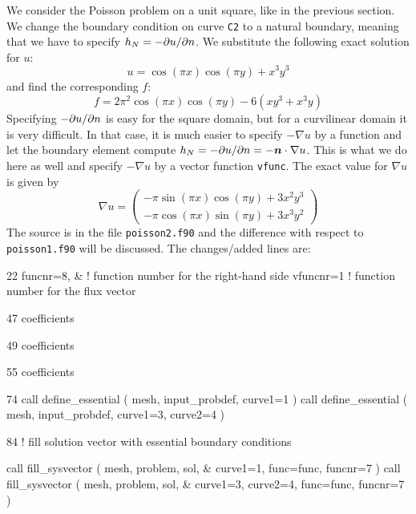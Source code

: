 \label{sec:poisson2}
We consider the Poisson problem on a unit square, like in the previous section. 
We change the boundary condition on curve \texttt{C2} to a natural boundary,
meaning that we have to specify $h_N=-\partial u/\partial n$. 
We substitute the following exact solution for $u$:
\begin{equation}
     u=\cos(\pi x)\cos(\pi y) + x^3y^3
\end{equation}
and find the corresponding $f$:
\begin{equation}
     f=2\pi^2\cos(\pi x)\cos(\pi y) - 6(xy^3+x^3y)
\end{equation}
Specifying $-\partial u/\partial n$ is easy for the square domain, but for a
curvilinear domain it is very difficult. In that case, it is much easier to
specify $-\nabla u$ by a function
and let the boundary element compute $h_N=-\partial u/\partial n=-\boldsymbol{n}\cdot\nabla u$.
This is what we do here as well and specify $-\nabla u$ by a vector function
\texttt{vfunc}. The exact value for $\nabla u$ is given by
\begin{equation}
   \nabla u=
\begin{pmatrix}
     -\pi\sin(\pi x)\cos(\pi y) + 3x^2y^3 \\
     -\pi\cos(\pi x)\sin(\pi y) + 3x^3y^2 
\end{pmatrix}
\end{equation}
The source is in the file \texttt{poisson2.f90} and the difference with respect
to \texttt{poisson1.f90} will be discussed. The changes/added lines are:
\begin{listing}{22}
    funcnr=8,           & ! function number for the right-hand side
    vfuncnr=1             ! function number for the flux vector
\end{listing}
\bigskip
\begin{listing}{47}
  coefficients%
\end{listing}
\bigskip
\begin{listing}{49}
  coefficients%
\end{listing}
\bigskip
\begin{listing}{55}
  coefficients%
\end{listing}
\bigskip
\begin{listing}{74}
  call define_essential ( mesh, input_probdef, curve1=1 )
  call define_essential ( mesh, input_probdef, curve1=3, curve2=4 )

\end{listing}
\bigskip
\begin{listing}{84}
! fill solution vector with essential boundary conditions
                                                                                
  call fill_sysvector ( mesh, problem, sol, &
    curve1=1, func=func, funcnr=7 )
  call fill_sysvector ( mesh, problem, sol, &
    curve1=3, curve2=4, func=func, funcnr=7 )

\end{listing}
